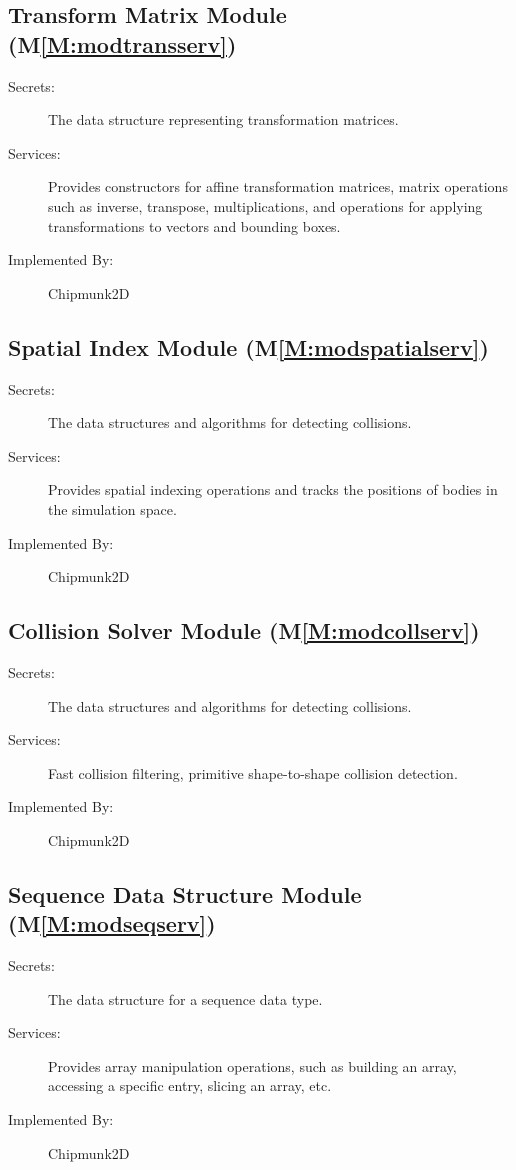 \documentclass[12pt]{article}
\begin{document}
\subsection{Transform Matrix Module (M\ref{M:modtransserv})}
\label{Sec:TranMatrModu()}
\begin{description}
\item[Secrets:]The data structure representing transformation matrices.
\item[Services:]Provides constructors for affine transformation matrices, matrix operations such as inverse, transpose, multiplications, and operations for applying transformations to vectors and bounding boxes.
\item[Implemented By:]Chipmunk2D
\end{description}
\subsection{Spatial Index Module (M\ref{M:modspatialserv})}
\label{Sec:SpatIndeModu()}
\begin{description}
\item[Secrets:]The data structures and algorithms for detecting collisions.
\item[Services:]Provides spatial indexing operations and tracks the positions of bodies in the simulation space.
\item[Implemented By:]Chipmunk2D
\end{description}
\subsection{Collision Solver Module (M\ref{M:modcollserv})}
\label{Sec:CollSolvModu()}
\begin{description}
\item[Secrets:]The data structures and algorithms for detecting collisions.
\item[Services:]Fast collision filtering, primitive shape-to-shape collision detection.
\item[Implemented By:]Chipmunk2D
\end{description}
\subsection{Sequence Data Structure Module (M\ref{M:modseqserv})}
\label{Sec:SequDataStruModu()}
\begin{description}
\item[Secrets:]The data structure for a sequence data type.
\item[Services:]Provides array manipulation operations, such as building an array, accessing a specific entry, slicing an array, etc.
\item[Implemented By:]Chipmunk2D
\end{description}
\end{document}
